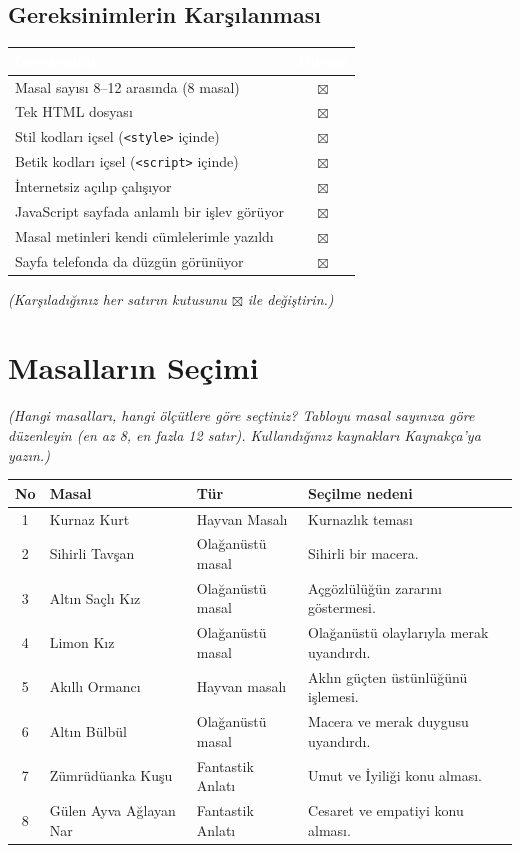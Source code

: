 \documentclass[12pt,a4paper]{article}
\newcommand{\aciklama}[1]{{\color{gray}\itshape (#1)}}
\begin{document}
\subsection{Gereksinimlerin Karşılanması}
\begin{center}
\begin{tabular}{@{}p{8.2cm}c@{}}
\toprule
\rowcolor{ana}\textcolor{white}{\textbf{Gereksinim}} & \textcolor{white}{\textbf{Durum}} \\
\midrule
Masal sayısı 8--12 arasında (8 masal)         & $\boxtimes$ \\
Tek HTML dosyası                                    & $\boxtimes$ \\
Stil kodları içsel (\texttt{<style>} içinde)        & $\boxtimes$ \\
Betik kodları içsel (\texttt{<script>} içinde)      & $\boxtimes$ \\
İnternetsiz açılıp çalışıyor                        & $\boxtimes$ \\
JavaScript sayfada anlamlı bir işlev görüyor        & $\boxtimes$ \\
Masal metinleri kendi cümlelerimle yazıldı          & $\boxtimes$ \\
Sayfa telefonda da düzgün görünüyor                 & $\boxtimes$ \\
\bottomrule
\end{tabular}
\end{center}
\aciklama{Karşıladığınız her satırın kutusunu $\boxtimes$ ile değiştirin.}

\section{Masalların Seçimi}
\aciklama{Hangi masalları, hangi ölçütlere göre seçtiniz? Tabloyu masal sayınıza göre
düzenleyin (en az 8, en fazla 12 satır). Kullandığınız kaynakları Kaynakça'ya yazın.}

\begin{longtable}{@{}cP{4cm}P{3cm}P{5.4cm}@{}}
\toprule
\textbf{No} & \textbf{Masal} & \textbf{Tür} & \textbf{Seçilme nedeni} \\
\midrule
{} & Kurnaz Kurt & Hayvan Masalı & Kurnazlık teması \\
2 & Sihirli Tavşan & Olağanüstü masal & Sihirli bir macera. \\
3 & Altın Saçlı Kız & Olağanüstü masal & Açgözlülüğün zararını göstermesi. \\
4 & Limon Kız & Olağanüstü masal & Olağanüstü olaylarıyla merak uyandırdı.\\
5 & Akıllı Ormancı & Hayvan masalı &  Aklın güçten üstünlüğünü işlemesi.  \\
6 & Altın Bülbül & Olağanüstü masal & Macera ve merak duygusu uyandırdı. \\
7 & Zümrüdüanka Kuşu & Fantastik Anlatı & Umut ve İyiliği konu alması.\\
8 & Gülen Ayva Ağlayan Nar & Fantastik Anlatı & Cesaret ve empatiyi konu alması. \\
\bottomrule
\end{longtable}
\end{document}
